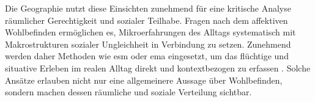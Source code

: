 Die Geographie nutzt diese Einsichten zunehmend für eine kritische Analyse räumlicher Gerechtigkeit und sozialer Teilhabe. Fragen nach dem affektiven Wohlbefinden ermöglichen es, Mikroerfahrungen des Alltags systematisch mit Makrostrukturen sozialer Ungleichheit in Verbindung zu setzen. Zunehmend werden daher Methoden wie \acrfull{esm} oder \acrfull{ema} eingesetzt, um das flüchtige und situative Erleben im realen Alltag direkt und kontextbezogen zu erfassen \parencite{songRecallBiasIntegrating2025}. Solche Ansätze erlauben nicht nur eine allgemeinere Aussage über Wohlbefinden, sondern machen dessen räumliche und soziale Verteilung sichtbar.
